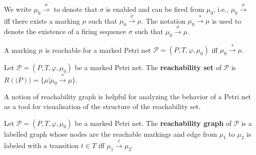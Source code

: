 We write $\mu_0\xrightarrow{\sigma}$ to denote that $\sigma$ is enabled and can be fired from $\mu_0$, i.e., $\mu_0\xrightarrow{\sigma}$ iff there exists a marking $\mu$ such that $\mu_0\xrightarrow{\sigma}\mu$.
The notation $\mu_0\xrightarrow{*}\mu$ is used to denote the existence of a firing sequence $\sigma$ such that $\mu_0\xrightarrow{\sigma}\mu$.

\begin{definition}
  A marking $\mu$ is reachable for a marked Petri net $\mathcal P = (P,T,\varphi,\mu_0)$ iff $\mu_0\xrightarrow{*}\mu$.
\end{definition}

\begin{definition}
  Let $\mathcal P = (P,T,\varphi,\mu_0)$ be a marked Petri net. The  {\bf reachability set} of $\mathcal P$ is $R(\mathcal(P)) = \{\mu|\mu_0\xrightarrow{*}\mu\}$.
\end{definition}

A notion of reachability graph is helpful for analyzing the behavior of a Petri net as a tool for visualisation of the structure of the reachability set.

\begin{definition}
  Let $\mathcal P = (P,T,\varphi,\mu_0)$ be a marked Petri net. The  {\bf reachability graph} of $\mathcal P$ is a labelled graph whose nodes are the reachable markings and edge from $\mu_1$ to $\mu_2$ is labeled with a transition $t\in T$ iff $\mu_1\xrightarrow{t}\mu_2$.
\end{definition}

